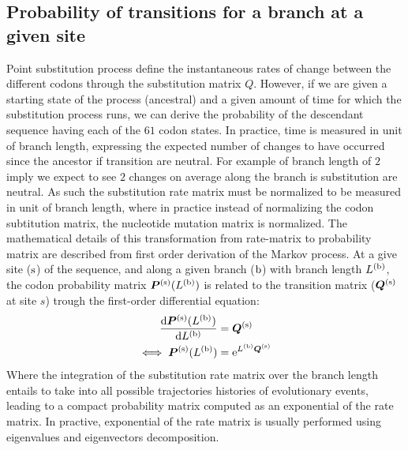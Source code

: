 \subsection{Probability of transitions for a branch at a given site}
Point substitution process define the instantaneous rates of change between the different codons through the substitution matrix $Q$.
However, if we are given a starting state of the process (ancestral) and a given amount of time for which the substitution process runs, we can derive the probability of the descendant sequence having each of the $61$ codon states.
In practice, time is measured in unit of branch length, expressing the expected number of changes to have occurred since the ancestor if transition are neutral.
For example of branch length of $2$ imply we expect to see $2$ changes on average along the branch is substitution are neutral.
As such the substitution rate matrix must be normalized to be measured in unit of branch length, where in practice instead of normalizing the codon subtitution matrix, the nucleotide mutation matrix is normalized.
The mathematical details of this transformation from rate-matrix to probability matrix are described from first order derivation of the Markov process.
At a give site ($\text{s}$) of the sequence, and along a given branch ($\text{b}$) with branch length $L^{(\text{b})}$, the codon probability matrix $\bm{P}^{(\text{s})}(L^{(\text{b})})$ is related to the transition matrix ($\bm{Q}^{(\text{s})}$ at site $s$) trough the first-order differential equation:
\begin{align}
	\dfrac{\mathrm{d} \bm{P}^{(\text{s})}(L^{(\text{b})})}{\mathrm{d} L^{(\text{b})}}	& = \bm{Q}^{(\text{s})} \\
	\iff \bm{P}^{(\text{s})}(L^{(\text{b})}) & = \mathrm{e}^{L^{(\text{b})} \bm{Q}^{(\text{s})}}
\end{align}
Where the integration of the substitution rate matrix over the branch length entails to take into all possible trajectories histories of evolutionary events, leading to a compact probability matrix computed as an exponential of the rate matrix.
In practive, exponential of the rate matrix is usually performed using eigenvalues and eigenvectors decomposition.

